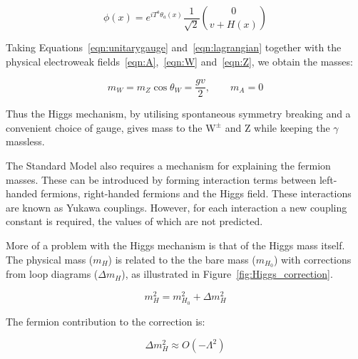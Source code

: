 
\begin{equation}
	\phi(x) = e^{iT^{a}\theta_{a}(x)} \frac{1}{\sqrt{2}}\binom{0}{v + H(x)}
	\label{eqn:unitarygauge}
\end{equation}

Taking Equations~\ref{eqn:unitarygauge} and~\ref{eqn:lagrangian} together with the physical electroweak fields~\ref{eqn:A},~\ref{eqn:W} and~\ref{eqn:Z}, we obtain the masses:


\begin{equation}
	m_{W} = m_{Z} \cos{\theta_{W}} = \frac{gv}{2}, \qquad m_{A} = 0
\end{equation}


Thus the Higgs mechanism, by utilising spontaneous symmetry breaking and a convenient choice of gauge, gives mass to the $\mathrm{W^{\pm}}$ and Z while keeping the $\gamma$ massless.   

The Standard Model also requires a mechanism for explaining the fermion masses. These can be introduced by forming interaction terms between left-handed fermions, right-handed fermions and the Higgs field. These interactions are known as Yukawa couplings. However, for each interaction a new coupling constant is required, the values of which are not predicted.

More of a problem with the Higgs mechanism is that of the Higgs mass itself. The physical mass ($m_{H}$) is related to the the bare mass ($m_{H_{0}}$) with corrections from loop diagrams ($\Delta m_{H}$), as illustrated in Figure~\ref{fig:Higgs_correction}.

\begin{equation}
	m_{H}^2 = m_{H_{0}}^{2} + \Delta m_{H}^2
\end{equation}

The fermion contribution to the correction is:

\begin{equation}
	\Delta m_{H}^{2} \approx O(-\Lambda^{2})
\end{equation}

